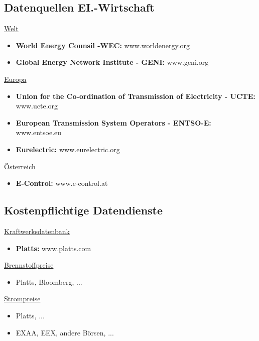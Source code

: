 \subsection{Datenquellen EI.-Wirtschaft}
\label{sec: datenquellen ei.-wirtschaft}

\underline{Welt}
\begin{itemize}
    \item \textbf{World Energy Counsil -WEC:} www.worldenergy.org
    \item \textbf{Global Energy Network Institute - GENI:} www.geni.org
\end{itemize}

\underline{Europa}
\begin{itemize}
    \item \textbf{Union for the Co-ordination of Transmission of Electricity - UCTE:} www.ucte.org
    \item \textbf{European Transmission System Operators - ENTSO-E:} www.entsoe.eu
    \item \textbf{Eurelectric:} www.eurelectric.org
\end{itemize}

\underline{Österreich}
\begin{itemize}
    \item \textbf{E-Control:} www.e-control.at
\end{itemize}

\newpage

\subsection{Kostenpflichtige Datendienste}
\label{sec: kostenpflichtige datendienste}

\underline{Kraftwerksdatenbank}
\begin{itemize}
    \item \textbf{Platts:} www.platts.com
\end{itemize}

\underline{Brennstoffpreise}
\begin{itemize}
    \item Platts, Bloomberg, ...
\end{itemize}

\underline{Strompreise}
\begin{itemize}
    \item Platts, ...
    \item EXAA, EEX, andere Börsen, ...
\end{itemize}

